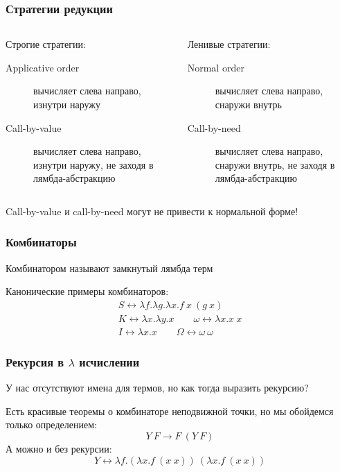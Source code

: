\documentclass[aspectratio=169]{beamer}
\begin{document}
\begin{frame}
    \frametitle{Стратегии редукции}

    \begin{columns}
        \begin{column}{0.5\textwidth}
            Строгие стратегии:
            \begin{description}
                \item[Applicative order] вычисляет слева направо, изнутри наружу
                \item[Call-by-value] вычисляет слева направо, изнутри наружу, не заходя в лямбда-абстракцию
            \end{description}
        \end{column}
        \begin{column}{0.5\textwidth}
            Ленивые стратегии:
            \begin{description}
                \item[Normal order] вычисляет слева направо, снаружи внутрь
                \item[Call-by-need] вычисляет слева направо, снаружи внутрь, не заходя в лямбда-абстракцию
            \end{description}
        \end{column}
    \end{columns}
    Call-by-value и call-by-need могут не привести к нормальной форме!
\end{frame}

\begin{frame}
    \frametitle{Комбинаторы}

    \begin{definition}
        Комбинатором называют замкнутый лямбда терм
    \end{definition}

    Канонические примеры комбинаторов:
    \begin{gather*}
        S \leftrightarrow \lambda f. \lambda g. \lambda x. f\ x\ (g\ x) \\
        K \leftrightarrow \lambda x. \lambda y. x \qquad \omega \leftrightarrow \lambda x. x\ x\\
        I \leftrightarrow \lambda x. x \qquad \Omega \leftrightarrow \omega\ \omega
    \end{gather*}
\end{frame}

\begin{frame}
    \frametitle{Рекурсия в $\lambda$ исчислении}

    У нас отсутствуют имена для термов, но как тогда выразить рекурсию?

    Есть красивые теоремы о комбинаторе неподвижной точки, но мы обойдемся только определением:
    \[Y\ F \rightarrow F\ (Y\ F)\]
    А можно и без рекурсии:
    \[Y \leftrightarrow \lambda f. (\lambda x.f\ (x\ x))\ (\lambda x.f\ (x\ x))\]

\end{frame}
\end{document}
